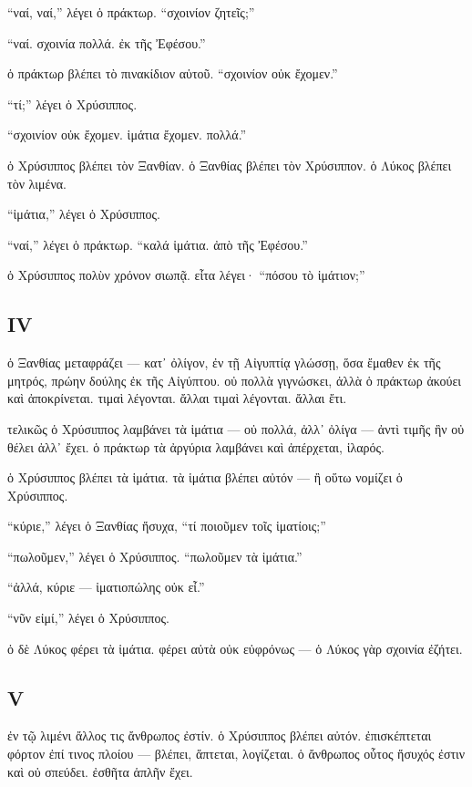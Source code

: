 \documentclass[a4paper]{report}
\begin{document}
``ναί, ναί,'' λέγει ὁ πράκτωρ. ``σχοινίον ζητεῖς;''

``ναί. σχοινία πολλά. ἐκ τῆς Ἐφέσου.''

ὁ πράκτωρ βλέπει τὸ πινακίδιον αὑτοῦ. ``σχοινίον οὐκ ἔχομεν.''

``τί;'' λέγει ὁ Χρύσιππος.

``σχοινίον οὐκ ἔχομεν. ἱμάτια ἔχομεν. πολλά.''

ὁ Χρύσιππος βλέπει τὸν Ξανθίαν. ὁ Ξανθίας βλέπει τὸν Χρύσιππον. ὁ Λύκος
βλέπει τὸν λιμένα.

``ἱμάτια,'' λέγει ὁ Χρύσιππος.

``ναί,'' λέγει ὁ πράκτωρ. ``καλά ἱμάτια. ἀπὸ τῆς Ἐφέσου.''

ὁ Χρύσιππος πολὺν χρόνον σιωπᾷ. εἶτα λέγει· ``πόσου τὸ ἱμάτιον;''

\subsection{IV}\label{iv-2}

ὁ Ξανθίας μεταφράζει --- κατ᾿ ὀλίγον, ἐν τῇ Αἰγυπτίᾳ γλώσσῃ, ὅσα ἔμαθεν
ἐκ τῆς μητρός, πρώην δούλης ἐκ τῆς Αἰγύπτου. οὐ πολλὰ γιγνώσκει, ἀλλὰ ὁ
πράκτωρ ἀκούει καὶ ἀποκρίνεται. τιμαὶ λέγονται. ἄλλαι τιμαὶ λέγονται.
ἄλλαι ἔτι.

τελικῶς ὁ Χρύσιππος λαμβάνει τὰ ἱμάτια --- οὐ πολλά, ἀλλ᾿ ὀλίγα --- ἀντὶ
τιμῆς ἣν οὐ θέλει ἀλλ᾿ ἔχει. ὁ πράκτωρ τὰ ἀργύρια λαμβάνει καὶ
ἀπέρχεται, ἱλαρός.

ὁ Χρύσιππος βλέπει τὰ ἱμάτια. τὰ ἱμάτια βλέπει αὐτόν --- ἢ οὕτω νομίζει
ὁ Χρύσιππος.

``κύριε,'' λέγει ὁ Ξανθίας ἥσυχα, ``τί ποιοῦμεν τοῖς ἱματίοις;''

``πωλοῦμεν,'' λέγει ὁ Χρύσιππος. ``πωλοῦμεν τὰ ἱμάτια.''

``ἀλλά, κύριε --- ἱματιοπώλης οὐκ εἶ.''

``νῦν εἰμί,'' λέγει ὁ Χρύσιππος.

ὁ δὲ Λύκος φέρει τὰ ἱμάτια. φέρει αὐτὰ οὐκ εὐφρόνως --- ὁ Λύκος γὰρ
σχοινία ἐζήτει.

\subsection{V}\label{v-3}

ἐν τῷ λιμένι ἄλλος τις ἄνθρωπος ἐστίν. ὁ Χρύσιππος βλέπει αὐτόν.
ἐπισκέπτεται φόρτον ἐπί τινος πλοίου --- βλέπει, ἅπτεται, λογίζεται. ὁ
ἄνθρωπος οὗτος ἥσυχός ἐστιν καὶ οὐ σπεύδει. ἐσθῆτα ἁπλῆν ἔχει.
\end{document}
